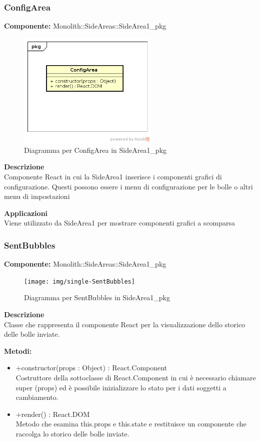 \subsubsection{ConfigArea}
\textbf{Componente:}  Monolith::SideAreas::SideArea1\_pkg\\
   \FloatBarrier
   \begin{figure}[ht]
   \centering
   \includegraphics[width=0.6\textwidth]{img/single-ConfigArea}
   \caption{{Diagramma per ConfigArea in SideArea1\_pkg}}
\end{figure}
\FloatBarrier
\textbf{Descrizione}\\
Componente React in cui la SideArea1 inserisce i componenti grafici di configurazione. Questi possono essere i menu di configurazione per le bolle o altri menu di impostazioni 


\textbf{Applicazioni}\\
Viene utilizzato da SideArea1 per mostrare componenti grafici a scomparsa 


\clearpage

\subsubsection{SentBubbles}
\textbf{Componente:}  Monolith::SideAreas::SideArea1\_pkg\\
   \FloatBarrier
   \begin{figure}[ht]
   \centering
   \texttt{[image: img/single-SentBubbles]}
   \caption{{Diagramma per SentBubbles in SideArea1\_pkg}}
\end{figure}
\FloatBarrier
\textbf{Descrizione}\\
Classe che rappresenta il componente React per la visualizzazione dello storico delle bolle inviate.

\textbf{Metodi:} 
\begin{itemize}

\item +constructor(props : Object) : React.Component 
\\
Costruttore della sottoclasse di React.Component in cui è necessario chiamare super (props) ed è possibile inizializzare lo stato per i dati soggetti a cambiamento.

\item +render() : React.DOM 
\\
Metodo che esamina this.props e this.state e restituisce un componente che raccolga lo storico delle bolle inviate.

\end{itemize} 


